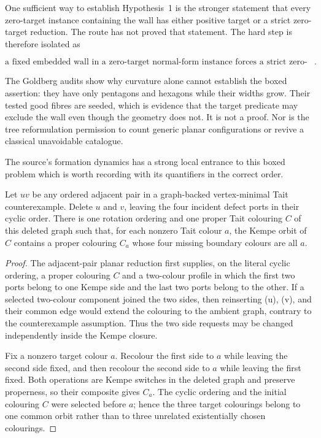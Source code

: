 One sufficient way to establish Hypothesis~1 is the stronger statement that
every zero-target instance containing the wall has either positive target or
a strict zero-target reduction.  The route has not proved that statement.
The hard step is therefore isolated as

\[
 \boxed{\text{a fixed embedded wall in a zero-target normal-form instance
 forces a strict zero-target reduction}.}
\]

The Goldberg audits show why curvature alone cannot establish the boxed
assertion: they have only pentagons and hexagons while their widths grow.
Their tested good fibres are seeded, which is evidence that the target
predicate may exclude the wall even though the geometry does not.  It is not
a proof.  Nor is the tree reformulation permission to count generic planar
configurations or revive a classical unavoidable catalogue.

The source's formation dynamics has a strong local entrance to this boxed
problem which is worth recording with its quantifiers in the correct order.

\begin{lemma}
\label{lem:adjacent-pair-common-constant-orbit}
Let \(uv\) be any ordered adjacent pair in a graph-backed vertex-minimal Tait
counterexample.  Delete \(u\) and \(v\), leaving the four incident defect
ports in their cyclic order.  There is one rotation ordering and one proper
Tait colouring \(C\) of this deleted graph such that, for each nonzero Tait
colour \(a\), the Kempe orbit of \(C\) contains a proper colouring \(C_a\)
whose four missing boundary colours are all \(a\).
\end{lemma}

\begin{proof}
The adjacent-pair planar reduction first supplies, on the literal cyclic
ordering, a proper colouring \(C\) and a two-colour profile in which the
first two ports belong to one Kempe side and the last two ports belong to
the other.  If a selected two-colour component joined the two sides, then
reinserting (u), (v), and their common edge would extend the colouring
to the ambient graph, contrary to the counterexample assumption.  Thus the
two side requests may be changed independently inside the Kempe closure.

Fix a nonzero target colour \(a\).  Recolour the first side to \(a\) while
leaving the second side fixed, and then recolour the second side to \(a\)
while leaving the first fixed.  Both operations are Kempe switches in the
deleted graph and preserve properness, so their composite gives \(C_a\).
The cyclic ordering and the initial colouring \(C\) were selected before
\(a\); hence the three target colourings belong to one common orbit rather
than to three unrelated existentially chosen colourings.
\end{proof}


